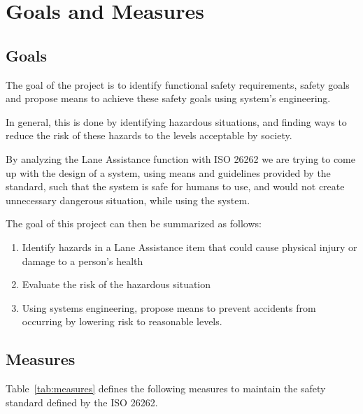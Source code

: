 \chapter{Goals and Measures}
\label{ch:goals_and_measures}

\section{Goals}

The goal of the project is to identify functional safety requirements, safety
goals and propose means to achieve these safety goals using system's
engineering.

In general, this is done by identifying hazardous situations, and finding ways
to reduce the risk of these hazards to the levels acceptable by society.

By analyzing the Lane Assistance function with ISO 26262 we are trying to come
up with the design of a system, using means and guidelines provided by the
standard, such that the system is safe for humans to use, and would not create
unnecessary dangerous situation, while using the system.

The goal of this project can then be summarized as follows:
\begin{enumerate}
  \item Identify hazards in a Lane Assistance item
	that could cause physical injury or damage to a person's health
  \item Evaluate the risk of the hazardous situation 
  \item Using systems engineering, propose means to prevent accidents from occurring 
	by lowering risk to reasonable levels. 
\end{enumerate}

\section{Measures}

Table~\ref{tab:measures} defines the following measures to maintain
the safety standard defined by the ISO 26262.

